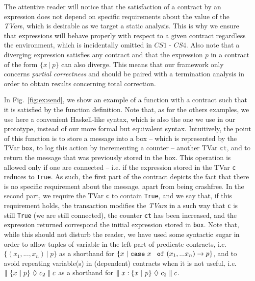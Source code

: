\documentclass[submission,copyright,creativecommons]{eptcs}
\newcommand{\code}[1]{\textrm{{\tt #1}}}
\newcommand{\caseof}[2]{\code{case} \ #1 \ \code{of} \ #2 }
\begin{document}
The attentive reader will notice that the satisfaction of a contract by an expression does not depend on specific requirements about the value of the \emph{TVar}s, which is desirable as we target a static analysis. This is why we ensure that expressions will behave properly with respect to a given contract regardless the environment, which is incidentally omitted in $CS1$ - $CS4$. 
Also note that a diverging expression satisfies any contract and that the expression $p$ in a contract of the form $\{ x \ | \ p \}$ can also diverge. This means that our framework only concerns \emph{partial correctness} and should be paired with a termination analysis \cite{binary-reachability-analysis,automated-termination-analysis} in order to obtain results concerning total correction.



In Fig.~\ref{fig:ex:send}, we show an example of a function with a contract such that it is satisfied by the function definition. 
Note that, as for the others examples, we use here a convenient Haskell-like syntax, which is also the one we use in our prototype, instead of our more formal but equivalent syntax.  
Intuitively, the point of this function is to store a message into a box -- which is represented by the TVar \texttt{box}, to log this action by incrementing a counter -- another TVar \texttt{ct}, and to return the message that was previously stored in the box. This operation is allowed only if one are connected -- i.e. if the expression stored in the TVar \texttt{c} reduces to \texttt{True}. As such, the first part of the contract depicts the fact that there is no specific requirement about the message, apart from being crashfree. In the second part, we require the TVar \texttt{c} to contain \texttt{True}, and we say that, if this requirement holds, the transaction modifies the \emph{TVar}s in a such way that \texttt{c} is still \texttt{True} (we are still connected), the counter \texttt{ct} has been increased, and the expression returned correspond the initial expression stored in \texttt{box}. Note that, while this should not disturb the reader, we have used some syntactic sugar in order to allow tuples of variable in the left part of predicate contracts, i.e. $\{ (x_1,...,x_n) \ | \ p \}$ as a shorthand for $\{ x \ | \ \caseof{x}{(x_1,...x_n) -> p} \}$, and to avoid repeating variable(s) in (dependent) contracts when it is not useful, i.e. $\contractTM{\{x \ |\ p\}}{c_2}{c}$ as a shorthand for $\parallel x:\{x \ | \ p\} \ \lozenge \ c_2 \parallel c$. 
\end{document}
